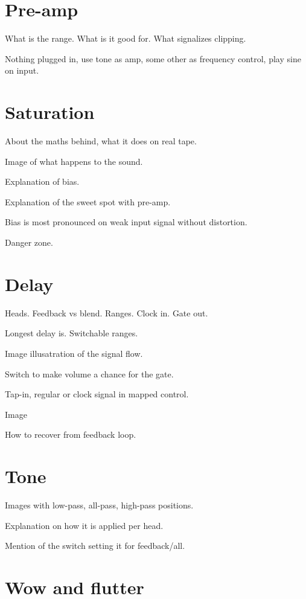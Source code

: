 \documentclass[11pt]{article}
\begin{document}
\newpage

\section{Pre-amp}

What is the range. What is it good for. What signalizes clipping.

Nothing plugged in, use tone as amp, some other as frequency control, play sine on input.

\section{Saturation}

About the maths behind, what it does on real tape.

Image of what happens to the sound.

Explanation of bias.

Explanation of the sweet spot with pre-amp.

Bias is most pronounced on weak input signal without distortion.

Danger zone.

\section{Delay}

Heads. Feedback vs blend. Ranges. Clock in. Gate out.

Longest delay is. Switchable ranges.

Image illusatration of the signal flow.

Switch to make volume a chance for the gate.

Tap-in, regular or clock signal in mapped control.

Image 

How to recover from feedback loop.

\section{Tone}

Images with low-pass, all-pass, high-pass positions.

Explanation on how it is applied per head.

Mention of the switch setting it for feedback/all.

\section{Wow and flutter}
\end{document}
